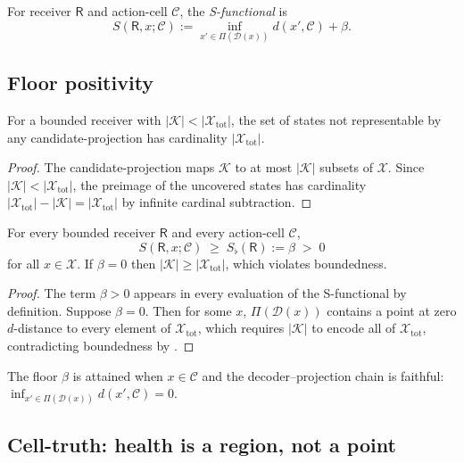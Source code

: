 \documentclass[twocolumn,11pt,a4paper]{article}
\newcommand{\Sfloor}{S_{\flat}}
\newcommand{\receiver}{\mathsf{R}}
\newcommand{\Cell}{\mathcal{C}}
\newcommand{\X}{\mathcal{X}}
\newcommand{\K}{\mathcal{K}}
\begin{document}
\begin{definition}[S-functional]\label{def:S}
For receiver $\receiver$ and action-cell $\Cell$, the \emph{S-functional}
is
\[
S(\receiver, x;\Cell) := \inf_{x'\in\Pi(\mathcal{D}(x))} d(x',\Cell) + \beta.
\]
\end{definition}

\subsection{Floor positivity}

\begin{lemma}\label{lem:residue}
For a bounded receiver with $|\K| < |\X_{\mathrm{tot}}|$, the set of states
not representable by any candidate-projection has cardinality
$|\X_{\mathrm{tot}}|$.
\end{lemma}

\begin{proof}
The candidate-projection maps $\K$ to at most $|\K|$ subsets of $\X$. Since
$|\K| < |\X_{\mathrm{tot}}|$, the preimage of the uncovered states has
cardinality $|\X_{\mathrm{tot}}| - |\K| = |\X_{\mathrm{tot}}|$ by
infinite cardinal subtraction.
\end{proof}

\begin{theorem}\label{thm:floor}
For every bounded receiver $\receiver$ and every action-cell $\Cell$,
\[
S(\receiver, x; \Cell) \;\geq\; \Sfloor(\receiver) := \beta \;>\; 0
\]
for all $x\in\X$. If $\beta = 0$ then $|\K| \geq |\X_{\mathrm{tot}}|$, which
violates boundedness.
\end{theorem}

\begin{proof}
The term $\beta > 0$ appears in every evaluation of the S-functional by
definition. Suppose $\beta = 0$. Then for some $x$, $\Pi(\mathcal{D}(x))$
contains a point at zero $d$-distance to every element of $\X_{\mathrm{tot}}$,
which requires $|\K|$ to encode all of $\X_{\mathrm{tot}}$, contradicting
boundedness by .
\end{proof}

\begin{corollary}[Attainment]\label{cor:attainment}
The floor $\beta$ is attained when $x\in\Cell$ and the decoder--projection
chain is faithful: $\inf_{x'\in\Pi(\mathcal{D}(x))}d(x',\Cell) = 0$.
\end{corollary}

\subsection{Cell-truth: health is a region, not a point}
\end{document}
